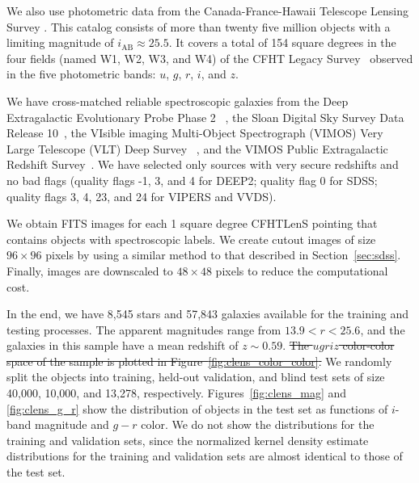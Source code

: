 \documentclass[fleqn,usenatbib]{mnras}
\begin{document}

We also use photometric data from
the Canada-France-Hawaii Telescope Lensing Survey
\cite[CFHTLenS\footnote{http://www.cfhtlens.org/};][]
{heymans2012cfhtlens,erben2013cfhtlens,hildebrandt2012cfhtlens}.
This catalog consists of more than twenty five million objects
with a limiting magnitude of $i_{\text{AB}} \approx 25.5$. 
It covers a total of 154 square degrees
in the four fields (named W1, W2, W3, and W4)
of the CFHT Legacy Survey~\citep[CFHTLS;][]{gwyn2012canada}
observed in the five photometric bands:
$u$, $g$, $r$, $i$, and $z$.

We have cross-matched reliable spectroscopic galaxies from
the Deep Extragalactic Evolutionary Probe Phase 2~
\citep[DEEP2;][]{davis2003science,newman2013deep2},
the Sloan Digital Sky Survey Data Release 10~\citep[SDSS-DR10]{alam2015eleventh},
the VIsible imaging Multi-Object Spectrograph (VIMOS)
Very Large Telescope (VLT) Deep Survey~
\citep[VVDS;][]{le2005vimos,garilli2008vimos}, and
the VIMOS Public Extragalactic Redshift
Survey~\citep[VIPERS;][]{garilli2014vimos}.
We have selected only sources with very secure
redshifts and no bad flags (quality flags -1, 3, and 4 for DEEP2;
quality flag 0 for SDSS; quality flags 3, 4, 23, and 24 for VIPERS
and VVDS).

We obtain FITS images for each 1 square degree CFHTLenS pointing
that contains objects with spectroscopic labels.
We create cutout images of size $96\times96$ pixels by using a similar method
to that described in Section~\ref{sec:sdss}.
Finally, images are downscaled to $48\times48$ pixels
to reduce the computational cost.

In the end, we have 8,545 stars and 57,843 galaxies available
for the training and testing processes.
The apparent magnitudes range from $13.9 < r < 25.6$,
and the galaxies in this sample have a mean redshift of $z \sim 0.59$.
\sout{
The $ugriz$ color-color space of the sample is plotted in
Figure~\ref{fig:clens_color_color}.
}
We randomly split the objects into training, held-out validation, and
blind test sets of size 40,000, 10,000, and 13,278, respectively.
Figures~\ref{fig:clens_mag} and \ref{fig:clens_g_r} show the distribution
of objects in the test set as functions of $i$-band magnitude and $g-r$ color.
We do not show the distributions for the training and validation sets,
since the normalized kernel density estimate distributions for the training
and validation sets are almost identical to those of the test set.
\end{document}
